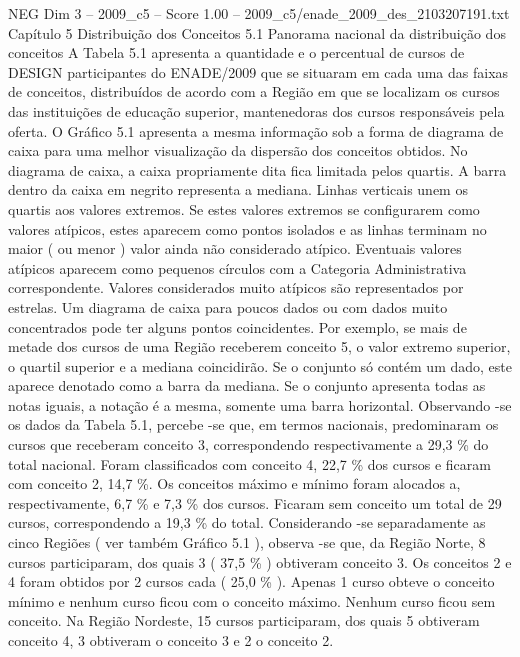 \begin{textsample}{NEG Dim 3 – 2009\_c5 – Score 1.00 – 2009\_c5/enade\_2009\_des\_2103207191.txt}  \label{ex:f3_neg_109}
Capítulo 5 Distribuição dos Conceitos 5.1 Panorama nacional da distribuição dos conceitos A Tabela 5.1 apresenta a quantidade e o percentual de cursos de DESIGN participantes do ENADE/2009 que se situaram em cada uma das faixas de conceitos, distribuídos de acordo com a Região em que se localizam os cursos das instituições de educação superior, mantenedoras dos cursos responsáveis pela oferta.
O Gráfico 5.1 apresenta a mesma informação sob a forma de diagrama de caixa para uma melhor visualização da dispersão dos conceitos obtidos.
No diagrama de caixa, a caixa propriamente dita fica limitada pelos quartis.
A barra dentro da caixa em negrito representa a mediana.
Linhas verticais unem os quartis aos valores extremos.
Se estes valores extremos se configurarem como valores atípicos, estes aparecem como pontos isolados e as linhas terminam no maior ( ou menor ) valor ainda não considerado atípico.
Eventuais valores atípicos aparecem como pequenos círculos com a Categoria Administrativa correspondente.
Valores considerados muito atípicos são representados por estrelas.
Um diagrama de caixa para poucos dados ou com dados muito concentrados pode ter alguns pontos coincidentes.
Por exemplo, se mais de metade dos cursos de uma Região receberem conceito 5, o valor extremo superior, o quartil superior e a mediana coincidirão.
Se o conjunto só contém um dado, este aparece denotado como a barra da mediana.
Se o conjunto apresenta todas as notas iguais, a notação é a mesma, somente uma barra horizontal.
Observando -se os dados da Tabela 5.1, percebe -se que, em termos nacionais, predominaram os cursos que receberam conceito 3, correspondendo respectivamente a 29,3 \% do total nacional.
Foram classificados com conceito 4, 22,7 \% dos cursos e ficaram com conceito 2, 14,7 \%.
Os conceitos máximo e mínimo foram alocados a, respectivamente, 6,7 \% e 7,3 \% dos cursos.
Ficaram sem conceito um total de 29 cursos, correspondendo a 19,3 \% do total.
Considerando -se separadamente as cinco Regiões ( ver também Gráfico 5.1 ), observa -se que, da Região Norte, 8 cursos participaram, dos quais 3 ( 37,5 \% ) obtiveram conceito 3.
Os conceitos 2 e 4 foram obtidos por 2 cursos cada ( 25,0 \% ).
Apenas 1 curso obteve o conceito mínimo e nenhum curso ficou com o conceito máximo.
Nenhum curso ficou sem conceito.
Na Região Nordeste, 15 cursos participaram, dos quais 5 obtiveram conceito 4, 3 obtiveram o conceito 3 e 2 o conceito 2.

\end{textsample}
